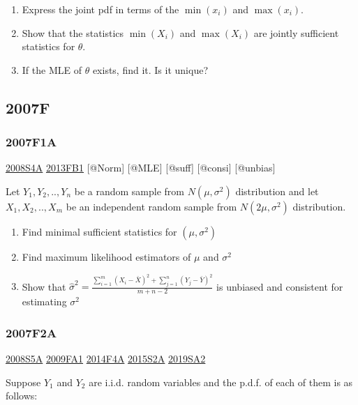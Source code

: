 \documentclass[6pt,twocolumn,Portrait]{article}
\begin{document}
\begin{enumerate}
\def\labelenumi{(\alph{enumi})}
\item
  Express the joint pdf in terms of the \(\min(x_i)\) and \(\max(x_i)\).
\item
  Show that the statistics \(\min(X_i)\) and \(\max(X_i)\) are jointly
  sufficient statistics for \(\theta\).
\item
  If the MLE of \(\theta\) exists, find it. Is it unique?
\end{enumerate}

\hypertarget{f-3}{%
\subsection{2007F}\label{f-3}}

\hypertarget{f1a}{%
\subsubsection{2007F1A}\label{f1a}}

\protect\hyperlink{s4a}{2008S4A} \protect\hyperlink{fb1-2}{2013FB1}
{[}@Norm{]} {[}@MLE{]} {[}@suff{]} {[}@consi{]} {[}@unbias{]}

Let \(Y_1,Y_2,..,Y_{n}\) be a random sample from \(N(\mu,\sigma^2)\)
distribution and let \(X_1,X_2,..,X_{m}\) be an independent random
sample from \(N(2\mu,\sigma^2)\) distribution.

\begin{enumerate}
\def\labelenumi{(\alph{enumi})}
\item
  Find minimal sufficient statistics for \((\mu,\sigma^2)\)
\item
  Find maximum likelihood estimators of \(\mu\) and \(\sigma^2\)
\item
  Show that
  \(\hat\sigma^2=\frac{\sum_{i=1}^m(X_i-\bar X)^2+\sum_{j=1}^n(Y_j-\bar Y)^2}{m+n-2}\)
  is unbiased and consistent for estimating \(\sigma^2\)
\end{enumerate}

\hypertarget{f2a}{%
\subsubsection{2007F2A}\label{f2a}}

\protect\hyperlink{s5a}{2008S5A} \protect\hyperlink{fa1}{2009FA1}
\protect\hyperlink{f4a-1}{2014F4A} \protect\hyperlink{s2a-1}{2015S2A}
\protect\hyperlink{sa2-3}{2019SA2}

Suppose \(Y_1\) and \(Y_2\) are i.i.d. random variables and the p.d.f.
of each of them is as follows:
\end{document}
